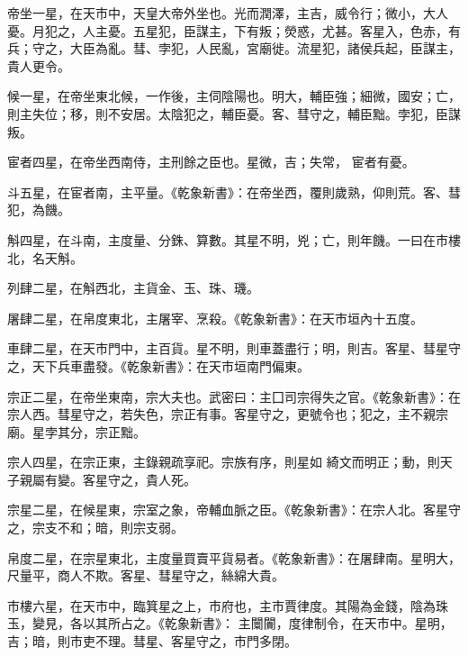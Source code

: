 \begin{pinyinscope}
 帝坐一星，在天市中，天皇大帝外坐也。光而潤澤，主吉，威令行；微小，大人憂。月犯之，人主憂。五星犯，臣謀主，下有叛；熒惑，尤甚。客星入，色赤，有兵；守之，大臣為亂。彗、孛犯，人民亂，宮廟徙。流星犯，諸侯兵起，臣謀主，貴人更令。



 候一星，在帝坐東北候，一作後，主伺陰陽也。明大，輔臣強；細微，國安；亡，則主失位；移，則不安居。太陰犯之，輔臣憂。客、彗守之，輔臣黜。孛犯，臣謀叛。



 宦者四星，在帝坐西南侍，主刑餘之臣也。星微，吉；失常，
 宦者有憂。



 斗五星，在宦者南，主平量。《乾象新書》：在帝坐西，覆則歲熟，仰則荒。客、彗犯，為饑。



 斛四星，在斗南，主度量、分銖、算數。其星不明，兇；亡，則年饑。一曰在市樓北，名天斛。



 列肆二星，在斛西北，主貨金、玉、珠、璣。



 屠肆二星，在帛度東北，主屠宰、烹殺。《乾象新書》：在天市垣內十五度。



 車肆二星，在天市門中，主百貨。星不明，則車蓋盡行；明，則吉。客星、彗星守之，天下兵車盡發。《乾象新書》：在天市垣南門偏東。



 宗正二星，在帝坐東南，宗大夫也。武密曰：主囗司宗得失之官。《乾象新書》：在宗人西。彗星守之，若失色，宗正有事。客星守之，更號令也；犯之，主不親宗廟。星孛其分，宗正黜。



 宗人四星，在宗正東，主錄親疏享祀。宗族有序，則星如
 綺文而明正；動，則天子親屬有變。客星守之，貴人死。



 宗星二星，在候星東，宗室之象，帝輔血脈之臣。《乾象新書》：在宗人北。客星守之，宗支不和；暗，則宗支弱。



 帛度二星，在宗星東北，主度量買賣平貨易者。《乾象新書》：在屠肆南。星明大，尺量平，商人不欺。客星、彗星守之，絲綿大貴。



 市樓六星，在天市中，臨箕星之上，市府也，主市賈律度。其陽為金錢，陰為珠玉，變見，各以其所占之。《乾象新書》：
 主闤闠，度律制令，在天市中。星明，吉；暗，則市吏不理。彗星、客星守之，市門多閉。




\end{pinyinscope}
